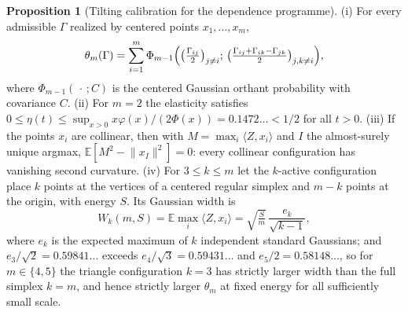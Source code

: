 \documentclass[11pt]{article}
\theoremstyle{definition}
\newcommand{\E}{\mathbb E}
\providecommand{\E}{\mathbb E}
\newtheorem{proposition}{Proposition}
\begin{document}
\begin{proposition}[Tilting calibration for the dependence programme]\label{ah:hr}
(i) For every admissible $\Gamma$ realized by centered points $x_1,\ldots,x_m$,
\[
\theta_m(\Gamma)=\sum_{i=1}^m\Phi_{m-1}\Bigl(\bigl(\tfrac{\Gamma_{ij}}2\bigr)_{j\ne i};\,\bigl(\tfrac{\Gamma_{ij}+\Gamma_{ik}-\Gamma_{jk}}2\bigr)_{j,k\ne i}\Bigr),
\]
where $\Phi_{m-1}(\,\cdot\,;C)$ is the centered Gaussian orthant probability with covariance $C$.  (ii) For $m=2$ the elasticity satisfies $0\le\eta(t)\le\sup_{x>0}x\varphi(x)/(2\Phi(x))=0.1472\ldots<1/2$ for all $t>0$.  (iii) If the points $x_i$ are collinear, then with $M=\max_i\langle Z,x_i\rangle$ and $I$ the almost-surely unique argmax, $\E[M^2-\lVert x_I\rVert^2]=0$: every collinear configuration has vanishing second curvature.  (iv) For $3\le k\le m$ let the $k$-active configuration place $k$ points at the vertices of a centered regular simplex and $m-k$ points at the origin, with energy $S$.  Its Gaussian width is
\[
W_k(m,S)=\E\max_i\langle Z,x_i\rangle=\sqrt{\tfrac Sm}\,\frac{e_k}{\sqrt{k-1}},
\]
where $e_k$ is the expected maximum of $k$ independent standard Gaussians; and $e_3/\sqrt2=0.59841\ldots$ exceeds $e_4/\sqrt3=0.59431\ldots$ and $e_5/2=0.58148\ldots$, so for $m\in\{4,5\}$ the triangle configuration $k=3$ has strictly larger width than the full simplex $k=m$, and hence strictly larger $\theta_m$ at fixed energy for all sufficiently small scale.
\end{proposition}
\end{document}
